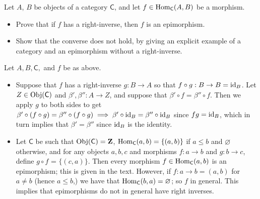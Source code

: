 \begin{problem}[4.3]
	\def \C {\mathsf{C}}
	Let $A$, $B$ be objects of a category $\mathsf{C}$, and let $f \in \mathrm{Hom}_\mathsf{C}(A, B)$ be a
	morphism. 
	\begin{itemize}
		\item Prove that if $f$ has a right-inverse, then $f$ is an epimorphism.
		\item Show that the converse does not hold, by giving an explicit example of a
		category and an epimorphism without a right-inverse.
	\end{itemize}
\end{problem}
\begin{solution}
	\def \C {\mathsf{C}}
	
	Let $A,B,\mathsf{C},$ and $f$ be as above.
	\begin{itemize}
		\item Suppose that $f$ has a right-inverse $g:B\to A$ so that $f\circ g: B\to B
		= \mathrm{id}_B$. Let $Z\in\mathrm{Obj}(\mathsf{C})$ and $\beta',\beta'':A\to Z$, and suppose that
		$\beta'\circ f=\beta''\circ f$. Then we apply $g$ to both sides to get
		$\beta'\circ(f\circ g) = \beta''\circ(f\circ g) \implies \beta'\circ\mathrm{id}_B =
		\beta''\circ \mathrm{id}_B$ since $fg=\mathrm{id}_B$, which in turn implies that
		$\beta'=\beta''$ since $\mathrm{id}_B$ is the identity.
		
		\item Let $\mathsf{C}$ be such that $\mathrm{Obj}(\mathsf{C}) = \mathbf{Z}$, $\mathrm{Hom}_\mathsf{C}(a,b)=\{(a,b)\}$ if
		$a\leq b$ and $\varnothing$ otherwise, and for any objects $a,b,c$ and morphisms
		$f:a\to b$ and $g:b\to c$, define $g\circ f$ = $\{(c,a)\}$. Then every morphism
		$f\in\mathrm{Hom}_\mathsf{C}(a,b)$ is an epimorphism; this is given in the text. However, if
		$f:a\to b = (a,b)$ for $a\neq b$ (hence $a\leq b$,) we have that
		$\mathrm{Hom}_\mathsf{C}(b,a)=\varnothing$; so $f$ in general. This implies that epimorphisms do
		not in general have right inverses.
	\end{itemize}
\end{solution}


